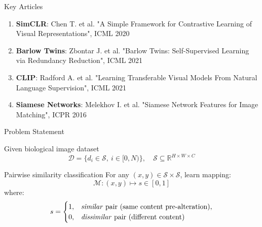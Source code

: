 \documentclass{beamer}
\begin{document}
\begin{frame}{Key Articles}
\begin{enumerate}
    \item \textbf{SimCLR}: Chen T. et al. "A Simple Framework for Contrastive Learning of Visual Representations", ICML 2020
    \item \textbf{Barlow Twins}: Zbontar J. et al. "Barlow Twins: Self-Supervised Learning via Redundancy Reduction", ICML 2021  
    \item \textbf{CLIP}: Radford A. et al. "Learning Transferable Visual Models From Natural Language Supervision", ICML 2021
    \item \textbf{Siamese Networks}: Melekhov I. et al. "Siamese Network Features for Image Matching", ICPR 2016
\end{enumerate}
\end{frame}


\begin{frame}{Problem Statement}
\begin{block}{Given biological image dataset}
    \begin{equation*}
        \mathcal{D} = \{d_i \in \mathcal{S},\ i \in [0, N)\},\quad 
        \mathcal{S} \subseteq \mathbb{R}^{H \times W \times C}
    \end{equation*}
\end{block}

\begin{block}{Pairwise similarity classification}
    For any $(x, y) \in \mathcal{S} \times \mathcal{S}$, learn mapping:
    \begin{equation*}
        \mathcal{M}: (x, y) \mapsto s \in [0, 1]
    \end{equation*}
    where:
    $$
    s = 
    \begin{cases}
    1, & \text{\textit{similar} pair (same content pre-alteration)}, \\
    0, & \text{\textit{dissimilar} pair (different content)}
    \end{cases}
    $$
\end{block}
\end{frame}

\end{document}
